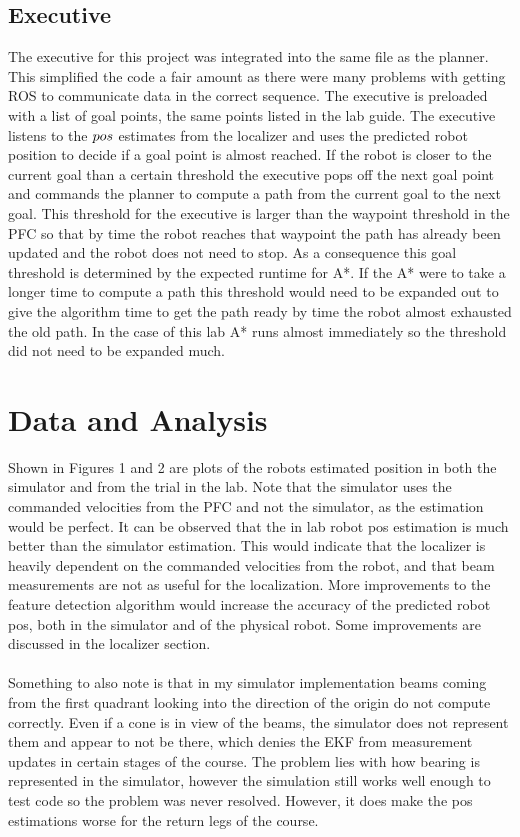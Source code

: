 \documentclass[letterpaper,12pt]{article}
\begin{document}
\subsection{Executive}
The executive for this project was integrated into the same file as the planner. This simplified the code a fair amount as there were many problems with getting ROS to communicate data in the correct sequence. The executive is preloaded with a list of goal points, the same points listed in the lab guide. The executive listens to the $\\pos$ estimates from the localizer and uses the predicted robot position to decide if a goal point is almost reached. If the robot is closer to the current goal than a certain threshold the executive pops off the next goal point and commands the planner to compute a path from the current goal to the next goal. This threshold for the executive is larger than the waypoint threshold in the PFC so that by time the robot reaches that waypoint the path has already been updated and the robot does not need to stop. As a consequence this goal threshold is determined by the expected runtime for A*. If the A* were to take a longer time to compute a path this threshold would need to be expanded out to give the algorithm time to get the path ready by time the robot almost exhausted the old path. In the case of this lab A* runs almost immediately so the threshold did not need to be expanded much.
\section{Data and Analysis}
Shown in Figures 1 and 2 are plots of the robots estimated position in both the simulator and from the trial in the lab. Note that the simulator uses the commanded velocities from the PFC and not the simulator, as the estimation would be perfect. It can be observed that the in lab robot pos estimation is much better than the simulator estimation. This would indicate that the localizer is heavily dependent on the commanded velocities from the robot, and that beam measurements are not as useful for the localization. More improvements to the feature detection algorithm would increase the accuracy of the predicted robot pos, both in the simulator and of the physical robot. Some improvements are discussed in the localizer section.
\\\\
Something to also note is that in my simulator implementation beams coming from the first quadrant looking into the direction of the origin do not compute correctly. Even if a cone is in view of the beams, the simulator does not represent them and appear to not be there, which denies the EKF from measurement updates in certain stages of the course. The problem lies with how bearing is represented in the simulator, however the simulation still works well enough to test code so the problem was never resolved. However, it does make the pos estimations worse for the return legs of the course. 
\end{document}
